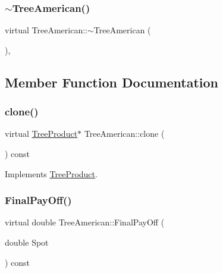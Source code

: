 \subsubsection{\texorpdfstring{$\sim$\+Tree\+American()}{~TreeAmerican()}}
{\footnotesize\ttfamily virtual Tree\+American\+::$\sim$\+Tree\+American (\begin{DoxyParamCaption}{ }\end{DoxyParamCaption})\hspace{0.3cm}{\ttfamily [inline]}, {\ttfamily [virtual]}}



\subsection{Member Function Documentation}
\hypertarget{classTreeAmerican_ade2d404dec9ebd28695f246393dd0256}{}\label{classTreeAmerican_ade2d404dec9ebd28695f246393dd0256} 
\subsubsection{\texorpdfstring{clone()}{clone()}}
{\footnotesize\ttfamily virtual \hyperlink{classTreeProduct}{Tree\+Product}$\ast$ Tree\+American\+::clone (\begin{DoxyParamCaption}{ }\end{DoxyParamCaption}) const\hspace{0.3cm}{\ttfamily [virtual]}}



Implements \hyperlink{classTreeProduct_a38edda2bee3c7203e94511df96a18c32}{Tree\+Product}.

\hypertarget{classTreeAmerican_ad3a967025c3355fdce85f5d28afcc302}{}\label{classTreeAmerican_ad3a967025c3355fdce85f5d28afcc302} 
\subsubsection{\texorpdfstring{Final\+Pay\+Off()}{FinalPayOff()}}
{\footnotesize\ttfamily virtual double Tree\+American\+::\+Final\+Pay\+Off (\begin{DoxyParamCaption}\item[{double}]{Spot }\end{DoxyParamCaption}) const\hspace{0.3cm}{\ttfamily [virtual]}}



